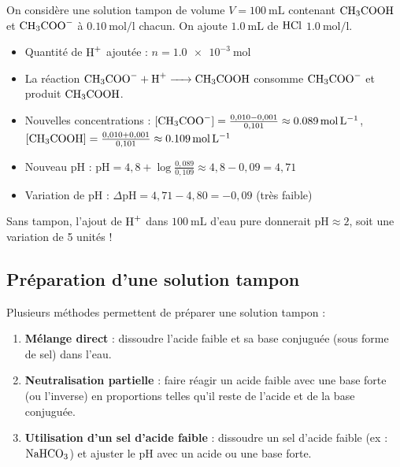 \begin{exemple}
On considère une solution tampon de volume $V = \SI{100}{\mL}$ contenant $\ce{CH3COOH}$ et $\ce{CH3COO-}$ à $\SI{0,10}{\mol\per\litre}$ chacun. On ajoute $\SI{1,0}{\mL}$ de $\ce{HCl}$ $\SI{1,0}{\mol\per\litre}$.
\begin{itemize}
    \item Quantité de $\ce{H+}$ ajoutée : $n = \SI{1,0e-3}{\mol}$
    \item La réaction $\ce{CH3COO- + H+ -> CH3COOH}$ consomme $\ce{CH3COO-}$ et produit $\ce{CH3COOH}$.
    \item Nouvelles concentrations : $[\ce{CH3COO-}] = \frac{0,010 - 0,001}{0,101} \approx \SI{0,089}{\mol\per\litre}$, $[\ce{CH3COOH}] = \frac{0,010 + 0,001}{0,101} \approx \SI{0,109}{\mol\per\litre}$
    \item Nouveau pH : $\mathrm{pH} = 4,8 + \log\frac{0,089}{0,109} \approx 4,8 - 0,09 = 4,71$
    \item Variation de pH : $\Delta\mathrm{pH} = 4,71 - 4,80 = -0,09$ (très faible)
\end{itemize}
Sans tampon, l'ajout de $\ce{H+}$ dans $\SI{100}{\mL}$ d'eau pure donnerait $\mathrm{pH} \approx 2$, soit une variation de 5 unités !
\end{exemple}

\subsection{Préparation d'une solution tampon}

\begin{experience}
Plusieurs méthodes permettent de préparer une solution tampon :
\begin{enumerate}
    \item \textbf{Mélange direct} : dissoudre l'acide faible et sa base conjuguée (sous forme de sel) dans l'eau.
    \item \textbf{Neutralisation partielle} : faire réagir un acide faible avec une base forte (ou l'inverse) en proportions telles qu'il reste de l'acide et de la base conjuguée.
    \item \textbf{Utilisation d'un sel d'acide faible} : dissoudre un sel d'acide faible (ex : $\ce{NaHCO3}$) et ajuster le pH avec un acide ou une base forte.
\end{enumerate}
\end{experience}

